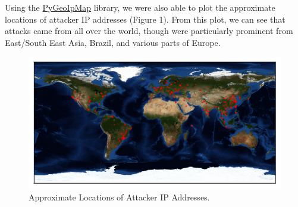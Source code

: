 Using the \href{https://github.com/pieqq/PyGeoIpMap}{PyGeoIpMap} library, we were also able to plot the approximate locations of attacker IP addresses (Figure 1). From this plot, we can see that attacks came from all over the world, though were particularly prominent from East/South East Asia, Brazil, and various parts of Europe.

\begin{figure}[H]
	\includegraphics[width=\linewidth]{output.png}
	\caption{Approximate Locations of Attacker IP Addresses.}
	\label{fig:map}
\end{figure}
